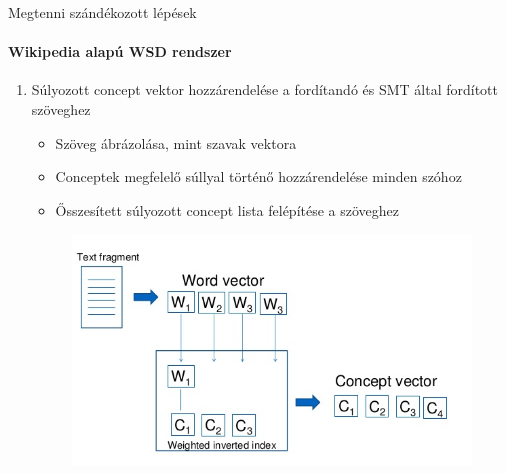 \begin{frame}{Megtenni szándékozott lépések}
\framesubtitle{Wikipedia alapú WSD rendszer}

	\begin{enumerate}
		\restorecounter
		
		\item Súlyozott concept vektor hozzárendelése a fordítandó és SMT által fordított szöveghez
		\begin{itemize}
			\item Szöveg ábrázolása, mint szavak vektora
			\item Conceptek megfelelő súllyal történő hozzárendelése minden szóhoz
			\item Ősszesített súlyozott concept lista felépítése a szöveghez
		\end{itemize}
		
		\begin{figure}[t]
			\includegraphics[scale=0.4]{images/textfragment}
 		\end{figure}			
 		
	\savecounter
 	
	\end{enumerate}
	
\end{frame}

